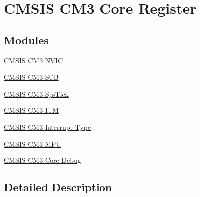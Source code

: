 \hypertarget{group___c_m_s_i_s___c_m3__core__register}{\section{C\-M\-S\-I\-S C\-M3 Core Register}
\label{group___c_m_s_i_s___c_m3__core__register}
}
\subsection*{Modules}
\begin{DoxyCompactItemize}
\item 
\hyperlink{group___c_m_s_i_s___c_m3___n_v_i_c}{C\-M\-S\-I\-S C\-M3 N\-V\-I\-C}
\item 
\hyperlink{group___c_m_s_i_s___c_m3___s_c_b}{C\-M\-S\-I\-S C\-M3 S\-C\-B}
\item 
\hyperlink{group___c_m_s_i_s___c_m3___sys_tick}{C\-M\-S\-I\-S C\-M3 Sys\-Tick}
\item 
\hyperlink{group___c_m_s_i_s___c_m3___i_t_m}{C\-M\-S\-I\-S C\-M3 I\-T\-M}
\item 
\hyperlink{group___c_m_s_i_s___c_m3___interrupt_type}{C\-M\-S\-I\-S C\-M3 Interrupt Type}
\item 
\hyperlink{group___c_m_s_i_s___c_m3___m_p_u}{C\-M\-S\-I\-S C\-M3 M\-P\-U}
\item 
\hyperlink{group___c_m_s_i_s___c_m3___core_debug}{C\-M\-S\-I\-S C\-M3 Core Debug}
\end{DoxyCompactItemize}


\subsection{Detailed Description}
